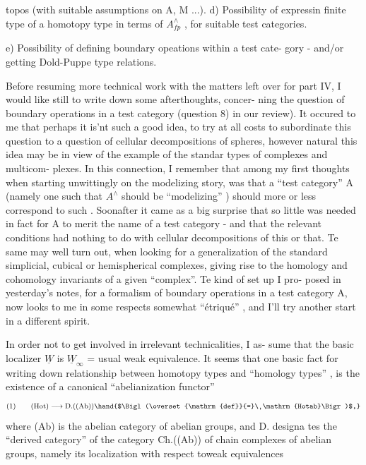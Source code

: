 
\margin{\{}topos (with suitable assumptions on A, M ...).
d) Possibility of expressin finite type of a homotopy type in terms
of $A^\wedge_{fp}$ , for suitable test categories.

\margin{$\uparrow$}e) Possibility of defining boundary opeations within a test cate-%
gory - and/or getting Dold-Puppe type relations.

\hand{* * *}

\margin{$\downarrow$}Before resuming more technical work with the matters left over for
part IV, I would like still to write down some afterthoughts, concer-%
ning the question of boundary operations in a test category (question
8) in our review). It occured to me that perhaps it is'nt such a good
idea, to try at all costs to subordinate this question to a question of
cellular decompositions of spheres, however natural this idea may be
in view of the example of the standar types of complexes and multicom-%
plexes. In this connection, I remember that among my first thoughts
when starting unwittingly on the modelizing story, was that a ``test
category'' A (namely one such that $A^\wedge$ should be ``modelizing'' ) should
more or less correspond to such . Soonafter it came as a
big surprise that so little was needed in fact for A to merit the name
of a test category - and that the  relevant conditions had nothing
to do with cellular decompositions of this or that. Te same may well
turn out, when looking for a generalization of the standard simplicial,
cubical or hemispherical  complexes, giving rise to the homology and
cohomology invariants of a given ``complex''. Te kind of set up I pro-%
posed in yesterday's notes, for a formalism of boundary operations
in a test category A, now looks to me in some respects somewhat 
``étriqué'' , and I'll try another start in a different spirit.

In order not to get involved in irrelevant technicalities, I as-%
sume that the basic localizer $\underline{W}$ is $\underline{W}_\infty$ = usual weak equivalence. It
seems that  one basic fact  for writing down relationship
between homotopy types and ``homology types'' , is the existence of a
canonical ``abelianization functor''
\[
\text{(1)}\qquad (\mathrm{Hot}) \longrightarrow \mathrm{D.}((\mathrm{Ab}))\hand{$\Bigl(\overset{\mathrm{def}}{=}\ \mathrm{Hotab}\Bigr)$,}
\]
where (Ab) is the abelian category of abelian groups, and D. designa
tes the ``derived category'' of  the category
Ch.((Ab)) of chain complexes of abelian groups, namely its localization
with respect toweak equivalences 

